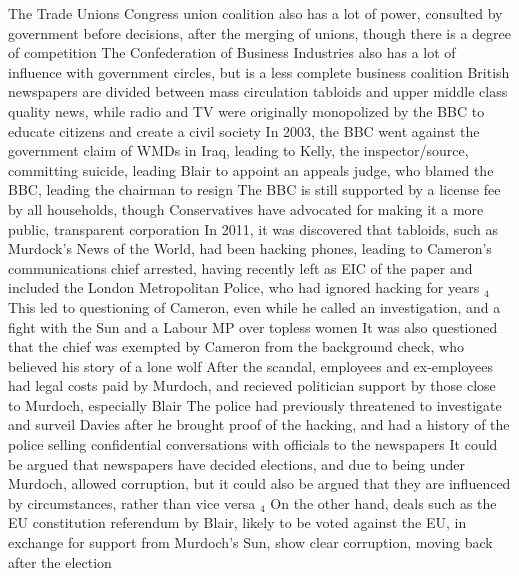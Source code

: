\documentclass[11 pt, twoside]{article}
\newcommand{\foot}[1]{\hyperlink{#1}{$_#1$}}
\newenvironment{outline*}
{
	\begin{outline}[enumerate]
	}
	{\end{outline}
}
\begin{document}
\begin{outline*}
\2 The Trade Unions Congress union coalition also has a lot of power, consulted by government before decisions, after the merging of unions, though there is a degree of competition
\2 The Confederation of Business Industries also has a lot of influence with government circles, but is a less complete business coalition
\1 British newspapers are divided between mass circulation tabloids and upper middle class quality news, while radio and TV were originally monopolized by the BBC to educate citizens and create a civil society
\2 In 2003, the BBC went against the government claim of WMDs in Iraq, leading to Kelly, the inspector/source, committing suicide, leading Blair to appoint an appeals judge, who blamed the BBC, leading the chairman to resign
\2 The BBC is still supported by a license fee by all households, though Conservatives have advocated for making it a more public, transparent corporation
\2 In 2011, it was discovered that tabloids, such as Murdock's News of the World, had been hacking phones, leading to Cameron's communications chief arrested, having recently left as EIC of the paper and included the London Metropolitan Police, who had ignored hacking for years \foot{4}
\3 This led to questioning of Cameron, even while he called an investigation, and a fight with the Sun and a Labour MP over topless women
\3 It was also questioned that the chief was exempted by Cameron from the background check, who believed his story of a lone wolf
\3 After the scandal, employees and ex-employees had legal costs paid by Murdoch, and recieved politician support by those close to Murdoch, especially Blair
\3 The police had previously threatened to investigate and surveil Davies after he brought proof of the hacking, and had a history of the police selling confidential conversations with officials to the newspapers
\2 It could be argued that newspapers have decided elections, and due to being under Murdoch, allowed corruption, but it could also be argued that they are influenced by circumstances, rather than vice versa \foot{4}
\3 On the other hand, deals such as the EU constitution referendum by Blair, likely to be voted against the EU, in exchange for support from Murdoch's Sun, show clear corruption, moving back after the election
\end{outline*}
\end{document}
